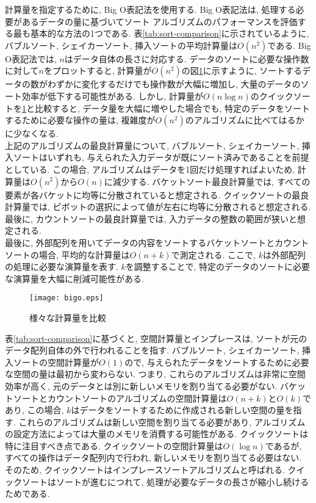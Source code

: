 \documentclass[a4j, 11pt]{jarticle}
\begin{document}
計算量を指定するために, Big O表記法を使用する. Big O表記法は, 処理する必要があるデータの量に基づいてソート アルゴリズムのパフォーマンスを評価する最も基本的な方法の1つである\cite{energo2023bigoh}. 表\ref{tab:sort-comparison}に示されているように, バブルソート, シェイカーソート, 挿入ソートの平均計算量は$O(n^2)$である. Big O表記法では, $n$はデータ自体の長さに対応する. データのソートに必要な操作数に対して$n$をプロットすると, 計算量が$O(n^2)$の図\ref{bigograph}に示すように, ソートするデータの数がわずかに変化するだけでも操作数が大幅に増加し, 大量のデータのソート効率が低下する可能性がある. しかし, 計算量が$O(n \log n)$のクイックソートを\ref{bigograph}と比較すると, データ量を大幅に増やした場合でも, 特定のデータをソートするために必要な操作の量は, 複雑度が$O(n^2)$のアルゴリズムに比べてはるかに少なくなる.\\

上記のアルゴリズムの最良計算量について, バブルソート, シェイカーソート, 挿入ソートはいずれも, 与えられた入力データが既にソート済みであることを前提としている. この場合, アルゴリズムはデータを1回だけ処理すればよいため, 計算量は$O(n^2)$から$O(n)$に減少する. バケットソート最良計算量では, すべての要素が各バケットに均等に分散されていると想定される. クイックソートの最良計算量では, ピボットの選択によって値が左右に均等に分散されると想定される. 最後に, カウントソートの最良計算量では, 入力データの整数の範囲が狭いと想定される. \\

最後に, 外部配列を用いてデータの内容をソートするバケットソートとカウントソートの場合, 平均的な計算量は$O(n + k)$で測定される. ここで, $k$は外部配列の処理に必要な演算量を表す. $k$を調整することで, 特定のデータのソートに必要な演算量を大幅に削減可能性がある.\\

\begin{figure}[H]
  \centering
  \texttt{[image: bigo.eps]}
  \caption{様々な計算量を比較}\label{bigograph}
\end{figure}

表\ref{tab:sort-comparison}に基づくと, 空間計算量とインプレースは, ソートが元のデータ配列自体の外で行われることを指す. バブルソート, シェイカーソート, 挿入ソートの空間計算量が$O(1)$ので, 与えられたデータをソートするために必要な空間の量は最初から変わらない. つまり, これらのアルゴリズムは非常に空間効率が高く, 元のデータとは別に新しいメモリを割り当てる必要がない. バケットソートとカウントソートのアルゴリズムの空間計算量は$O(n + k)$と$O(k)$であり, この場合, $k$はデータをソートするために作成される新しい空間の量を指す. これらのアルゴリズムは新しい空間を割り当てる必要があり, アルゴリズムの設定方法によっては大量のメモリを消費する可能性がある. クイックソートは特に注目すべき点である. クイックソートの空間計算量は$O(\log n)$であるが, すべての操作はデータ配列内で行われ, 新しいメモリを割り当てる必要はない. そのため, クイックソートはインプレースソートアルゴリズムと呼ばれる. クイックソートはソートが進むにつれて, 処理が必要なデータの長さが縮小し続けるためである.\\
\end{document}

